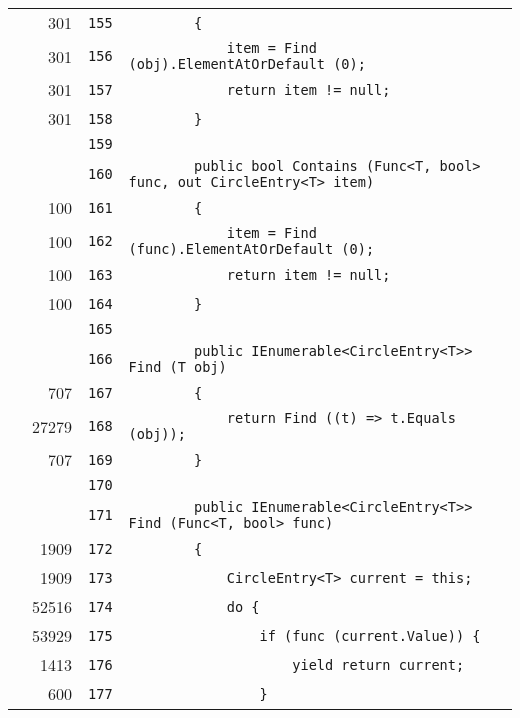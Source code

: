 \documentclass[a4paper,10pt]{article}
\begin{document}
\begin{longtable}[l]{lrrl}
\cellcolor{green} & 301 & \verb~155~ & \verb~        {~\\
\cellcolor{green} & 301 & \verb~156~ & \verb~            item = Find (obj).ElementAtOrDefault (0);~\\
\cellcolor{green} & 301 & \verb~157~ & \verb~            return item != null;~\\
\cellcolor{green} & 301 & \verb~158~ & \verb~        }~\\
\cellcolor{gray} &  & \verb~159~ & \verb~~\\
\cellcolor{gray} &  & \verb~160~ & \verb~        public bool Contains (Func<T, bool> func, out CircleEntry<T> item)~\\
\cellcolor{green} & 100 & \verb~161~ & \verb~        {~\\
\cellcolor{green} & 100 & \verb~162~ & \verb~            item = Find (func).ElementAtOrDefault (0);~\\
\cellcolor{green} & 100 & \verb~163~ & \verb~            return item != null;~\\
\cellcolor{green} & 100 & \verb~164~ & \verb~        }~\\
\cellcolor{gray} &  & \verb~165~ & \verb~~\\
\cellcolor{gray} &  & \verb~166~ & \verb~        public IEnumerable<CircleEntry<T>> Find (T obj)~\\
\cellcolor{green} & 707 & \verb~167~ & \verb~        {~\\
\cellcolor{green} & 27279 & \verb~168~ & \verb~            return Find ((t) => t.Equals (obj));~\\
\cellcolor{green} & 707 & \verb~169~ & \verb~        }~\\
\cellcolor{gray} &  & \verb~170~ & \verb~~\\
\cellcolor{gray} &  & \verb~171~ & \verb~        public IEnumerable<CircleEntry<T>> Find (Func<T, bool> func)~\\
\cellcolor{green} & 1909 & \verb~172~ & \verb~        {~\\
\cellcolor{green} & 1909 & \verb~173~ & \verb~            CircleEntry<T> current = this;~\\
\cellcolor{green} & 52516 & \verb~174~ & \verb~            do {~\\
\cellcolor{green} & 53929 & \verb~175~ & \verb~                if (func (current.Value)) {~\\
\cellcolor{green} & 1413 & \verb~176~ & \verb~                    yield return current;~\\
\cellcolor{green} & 600 & \verb~177~ & \verb~                }~\\

\end{longtable}
\end{document}
